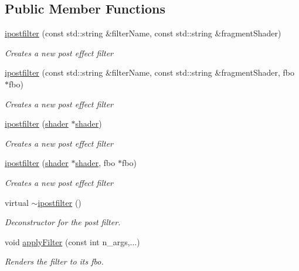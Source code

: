 \subsection*{Public Member Functions}
\begin{DoxyCompactItemize}
\item 
\hyperlink{classflounder_1_1ipostfilter_adb158fccda942f9d05ec2c21ea3f8654}{ipostfilter} (const std\+::string \&filter\+Name, const std\+::string \&fragment\+Shader)
\begin{DoxyCompactList}\small\item\em Creates a new post effect filter \end{DoxyCompactList}\item 
\hyperlink{classflounder_1_1ipostfilter_a2c792b5d59c2b47b1f3b75a7a1404df0}{ipostfilter} (const std\+::string \&filter\+Name, const std\+::string \&fragment\+Shader, fbo $\ast$fbo)
\begin{DoxyCompactList}\small\item\em Creates a new post effect filter \end{DoxyCompactList}\item 
\hyperlink{classflounder_1_1ipostfilter_a90d67fde6f8fe6ff4e3a7dba0fab418d}{ipostfilter} (\hyperlink{classflounder_1_1shader}{shader} $\ast$\hyperlink{classflounder_1_1shader}{shader})
\begin{DoxyCompactList}\small\item\em Creates a new post effect filter \end{DoxyCompactList}\item 
\hyperlink{classflounder_1_1ipostfilter_a45622b81739ebad815b69526a878b054}{ipostfilter} (\hyperlink{classflounder_1_1shader}{shader} $\ast$\hyperlink{classflounder_1_1shader}{shader}, fbo $\ast$fbo)
\begin{DoxyCompactList}\small\item\em Creates a new post effect filter \end{DoxyCompactList}\item 
virtual \hyperlink{classflounder_1_1ipostfilter_aca15b2f21a5f07ddcff5dcad764e137c}{$\sim$ipostfilter} ()
\begin{DoxyCompactList}\small\item\em Deconstructor for the post filter. \end{DoxyCompactList}\item 
void \hyperlink{classflounder_1_1ipostfilter_a34cced83864d9d6b1c664a0337cd97b2}{apply\+Filter} (const int n\+\_\+args,...)
\begin{DoxyCompactList}\small\item\em Renders the filter to its fbo. \end{DoxyCompactList}\item 

\end{DoxyCompactItemize}
